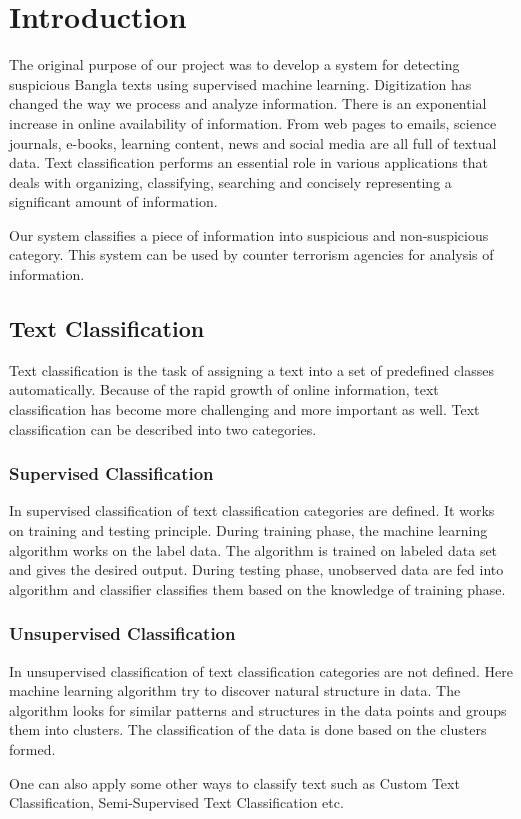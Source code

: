\chapter{Introduction}
\thispagestyle{empty}
The original purpose of our project was to develop a system for detecting suspicious Bangla texts using supervised machine learning. Digitization has changed the way we process and analyze information. There is an exponential increase in online availability of information. From web pages to emails, science journals, e-books, learning content, news and social media are all full of textual data. Text classification performs an essential role in various applications that deals with organizing, classifying, searching and concisely representing a significant amount of information.\par
\vspace{.2cm}
Our system classifies a piece of information into suspicious and non-suspicious category. This system can be used by counter terrorism agencies for analysis of information.

\section{Text Classification}
Text classification is the task of assigning a text into a set of predefined classes automatically. Because of the rapid growth of online information, text classification has become more challenging and more important as well. Text classification can be described into two categories.
\subsection{Supervised Classification}
In supervised classification of text classification categories are defined. It works on training and testing principle. During training phase, the machine learning algorithm works on the label data. The algorithm is trained on labeled data set and gives the desired output. During testing phase, unobserved data are fed into algorithm and classifier classifies them based on the knowledge of training phase.
\subsection{Unsupervised Classification}
In unsupervised classification of text classification categories are not defined. Here machine learning algorithm try to discover natural structure in data. The algorithm looks for similar patterns and structures in the data points and groups them into clusters. The classification of the data is done based on the clusters formed.\par
One can also apply some other ways to classify text such as Custom Text Classification, Semi-Supervised Text Classification etc.

